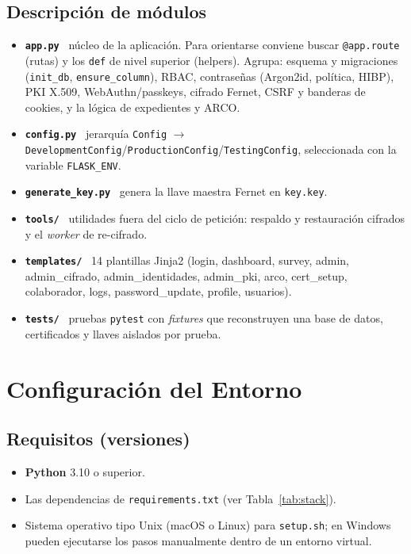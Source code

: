 \documentclass[10pt,letterpaper]{report}
\begin{document}
\section{Descripci\'on de m\'odulos}
\begin{itemize}
  \item \textbf{\texttt{app.py}} \textemdash\ n\'ucleo de la aplicaci\'on. Para orientarse conviene
  buscar \texttt{@app.route} (rutas) y los \texttt{def} de nivel superior (helpers). Agrupa: esquema y
  migraciones (\texttt{init\_db}, \texttt{ensure\_column}), RBAC, contrase\~nas (Argon2id, pol\'itica,
  HIBP), PKI X.509, WebAuthn/passkeys, cifrado Fernet, CSRF y banderas de cookies, y la l\'ogica de
  expedientes y ARCO.
  \item \textbf{\texttt{config.py}} \textemdash\ jerarqu\'ia \texttt{Config} $\rightarrow$
  \texttt{DevelopmentConfig}/\texttt{ProductionConfig}/\texttt{TestingConfig}, seleccionada con la
  variable \texttt{FLASK\_ENV}.
  \item \textbf{\texttt{generate\_key.py}} \textemdash\ genera la llave maestra Fernet en \texttt{key.key}.
  \item \textbf{\texttt{tools/}} \textemdash\ utilidades fuera del ciclo de petici\'on: respaldo y
  restauraci\'on cifrados y el \emph{worker} de re-cifrado.
  \item \textbf{\texttt{templates/}} \textemdash\ 14 plantillas Jinja2 (login, dashboard, survey,
  admin, admin\_cifrado, admin\_identidades, admin\_pki, arco, cert\_setup, colaborador, logs,
  password\_update, profile, usuarios).
  \item \textbf{\texttt{tests/}} \textemdash\ pruebas \texttt{pytest} con \emph{fixtures} que
  reconstruyen una base de datos, certificados y llaves aislados por prueba.
\end{itemize}

\chapter{Configuraci\'on del Entorno}

\section{Requisitos (versiones)}
\begin{itemize}
  \item \textbf{Python} 3.10 o superior.
  \item Las dependencias de \texttt{requirements.txt} (ver Tabla~\ref{tab:stack}).
  \item Sistema operativo tipo Unix (macOS o Linux) para \texttt{setup.sh}; en Windows pueden
  ejecutarse los pasos manualmente dentro de un entorno virtual.
\end{itemize}
\end{document}

